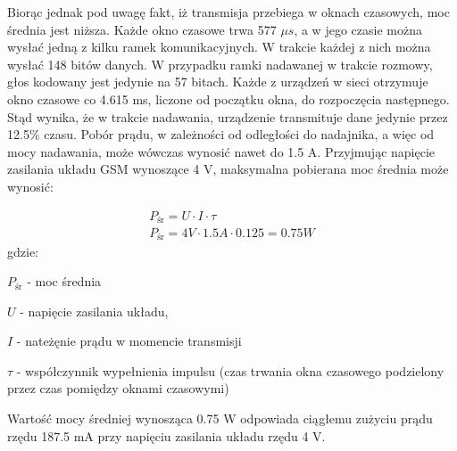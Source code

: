 Biorąc jednak pod uwagę fakt, iż transmisja przebiega w oknach czasowych, moc średnia jest niższa. Każde okno czasowe trwa 577 $\mu s$, a w jego czasie można wysłać jedną z kilku ramek komunikacyjnych. W trakcie każdej z nich można wysłać 148 bitów danych. W przypadku ramki nadawanej w trakcie rozmowy, głos kodowany jest jedynie na 57 bitach. Każde z urządzeń w sieci otrzymuje okno czasowe co 4.615 ms, liczone od początku okna, do rozpoczęcia następnego. Stąd wynika, że  w trakcie nadawania, urządzenie transmituje dane jedynie przez 12.5\% czasu. Pobór prądu, w zależności od odległości do nadajnika, a więc od mocy nadawania, może wówczas wynosić nawet do 1.5 A. Przyjmując napięcie zasilania układu GSM wynoszące 4 V, maksymalna pobierana moc średnia może wynosić:

\begin{gather}
 	P_{\text{śr}} = U \cdot I \cdot \tau \\
 	P_{\text{śr}} = 4 V \cdot 1.5 A \cdot 0.125 = 0.75 W \nonumber 	
 	\label{eq_gsm_power_mean} 
\end{gather}
 gdzie:
 
 $P_{\text{śr}} $ - moc średnia
 
 $U$ - napięcie zasilania układu,
 
 $I$ - nateżęnie prądu w momencie transmisji
 
 $\tau$ - współczynnik wypełnienia impulsu (czas trwania okna czasowego podzielony przez czas pomiędzy oknami czasowymi)
 
Wartość mocy średniej wynosząca 0.75 W odpowiada ciągłemu zużyciu prądu rzędu 187.5 mA przy napięciu zasilania układu rzędu 4 V. 



